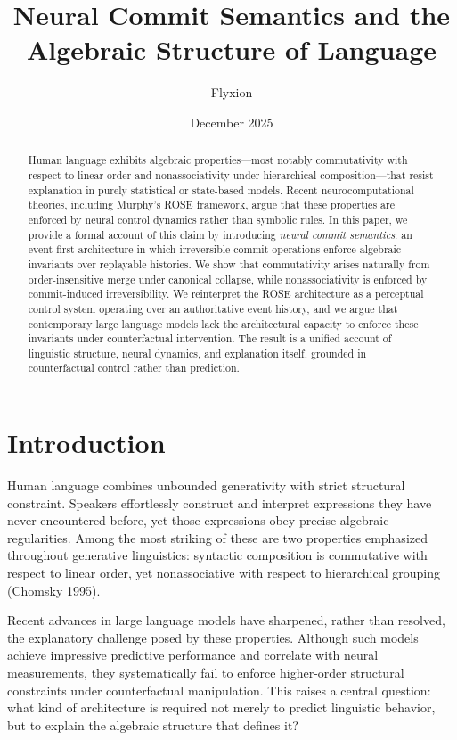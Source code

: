 \documentclass[11pt]{article}
\title{Neural Commit Semantics and the Algebraic Structure of Language}
\author{Flyxion}
\date{December 2025}
\begin{document}
\maketitle

\begin{abstract}
Human language exhibits algebraic properties—most notably commutativity with respect to linear order and nonassociativity under hierarchical composition—that resist explanation in purely statistical or state-based models. Recent neurocomputational theories, including Murphy’s ROSE framework, argue that these properties are enforced by neural control dynamics rather than symbolic rules. In this paper, we provide a formal account of this claim by introducing \emph{neural commit semantics}: an event-first architecture in which irreversible commit operations enforce algebraic invariants over replayable histories. We show that commutativity arises naturally from order-insensitive merge under canonical collapse, while nonassociativity is enforced by commit-induced irreversibility. We reinterpret the ROSE architecture as a perceptual control system operating over an authoritative event history, and we argue that contemporary large language models lack the architectural capacity to enforce these invariants under counterfactual intervention. The result is a unified account of linguistic structure, neural dynamics, and explanation itself, grounded in counterfactual control rather than prediction.
\end{abstract}

\section{Introduction}

Human language combines unbounded generativity with strict structural constraint. Speakers effortlessly construct and interpret expressions they have never encountered before, yet those expressions obey precise algebraic regularities. Among the most striking of these are two properties emphasized throughout generative linguistics: syntactic composition is commutative with respect to linear order, yet nonassociative with respect to hierarchical grouping (Chomsky 1995).

Recent advances in large language models have sharpened, rather than resolved, the explanatory challenge posed by these properties. Although such models achieve impressive predictive performance and correlate with neural measurements, they systematically fail to enforce higher-order structural constraints under counterfactual manipulation. This raises a central question: what kind of architecture is required not merely to predict linguistic behavior, but to explain the algebraic structure that defines it?
\end{document}
